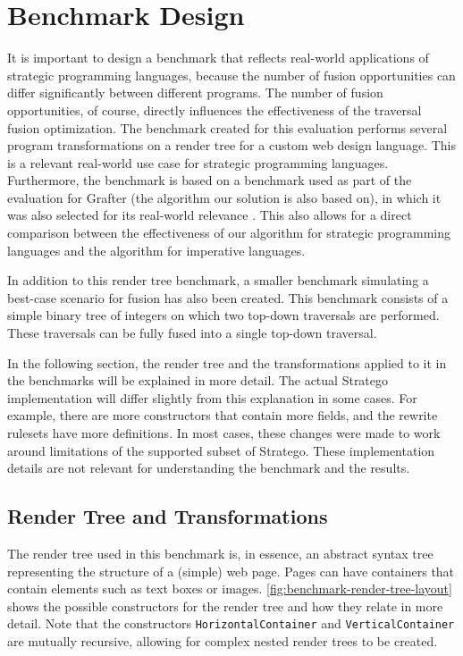 \section{Benchmark Design}
It is important to design a benchmark that reflects real-world applications of strategic programming languages, because the number of fusion opportunities can differ significantly between different programs. The number of fusion opportunities, of course, directly influences the effectiveness of the traversal fusion optimization. The benchmark created for this evaluation performs several program transformations on a render tree for a custom web design language. This is a relevant real-world use case for strategic programming languages. Furthermore, the benchmark is based on a benchmark used as part of the evaluation for Grafter (the algorithm our solution is also based on), in which it was also selected for its real-world relevance \cite{SakkaSN019}. This also allows for a direct comparison between the effectiveness of our algorithm for strategic programming languages and the algorithm for imperative languages.

In addition to this render tree benchmark, a smaller benchmark simulating a best-case scenario for fusion has also been created. This benchmark consists of a simple binary tree of integers on which two top-down traversals are performed. These traversals can be fully fused into a single top-down traversal.

In the following section, the render tree and the transformations applied to it in the benchmarks will be explained in more detail. The actual Stratego implementation will differ slightly from this explanation in some cases. For example, there are more constructors that contain more fields, and the rewrite rulesets have more definitions. In most cases, these changes were made to work around limitations of the supported subset of Stratego. These implementation details are not relevant for understanding the benchmark and the results.

\subsection{Render Tree and Transformations}
The render tree used in this benchmark is, in essence, an abstract syntax tree representing the structure of a (simple) web page. Pages can have containers that contain elements such as text boxes or images. \autoref{fig:benchmark-render-tree-layout} shows the possible constructors for the render tree and how they relate in more detail. Note that the constructors \texttt{HorizontalContainer} and \texttt{VerticalContainer} are mutually recursive, allowing for complex nested render trees to be created.

